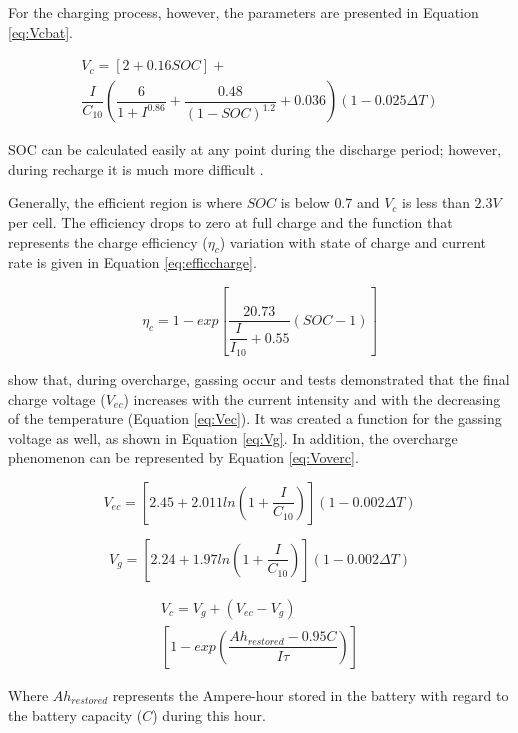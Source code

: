 \documentclass[journal]{IEEEtran}
\begin{document}
For the charging process, however, the parameters are presented in Equation \ref{eq:Vcbat}.

\begin{multline}
\label{eq:Vcbat}
V_{c} = [2+0.16SOC]+ \\ \dfrac{I}{C_{10}} \left( \dfrac{6}{1+I^{0.86}} + \dfrac{0.48}{(1-SOC)^{1.2}} + 0.036  \right) (1-0.025 \Delta T)
\end{multline}

SOC can be calculated easily at any point during the discharge period; however, during recharge it is much more difficult \cite{Copetti}.

Generally, the efficient region is where $ SOC $ is below $ 0.7 $ and $ V_{c} $ is less than $2.3 V$ per cell. The efficiency drops to zero at full charge and the function that represents the charge efficiency ($ \eta_{c} $) variation with state of charge and current rate is given in Equation \ref{eq:efficcharge}.

\begin{equation}
\label{eq:efficcharge}
\eta_{c} = 1 - exp \left[ \dfrac{20.73}{\dfrac{I}{I_{10}}+0.55} (SOC-1) \right] 
\end{equation}

\cite{Copetti} show that, during overcharge, gassing occur and tests demonstrated that the final charge voltage ($ V_{ec} $) increases with the current intensity and with the decreasing of the temperature (Equation \ref{eq:Vec}). It was created a function for the gassing voltage as well, as shown in Equation \ref{eq:Vg}. In addition, the overcharge phenomenon can be represented by Equation \ref{eq:Voverc}.

\begin{equation}
\label{eq:Vec}
V_{ec} = \left[ 2.45 + 2.011 ln \left( 1+\dfrac{I}{C_{10}} \right)  \right] (1-0.002 \Delta T)
\end{equation}

\begin{equation}
\label{eq:Vg}
V_{g} = \left[ 2.24 + 1.97 ln \left( 1+\dfrac{I}{C_{10}} \right)  \right] (1-0.002 \Delta T)
\end{equation}

\begin{multline}
\label{eq:Voverc}
V_{c} = V_{g} + (V_{ec} - V_{g}) \\ \left[ 1- exp \left( \dfrac{Ah_{restored}-0.95C}{I\tau}  \right)    \right] 
\end{multline}

Where $ Ah_{restored} $ represents the Ampere-hour stored in the battery with regard to the battery capacity ($ C $) during this hour.
\end{document}
